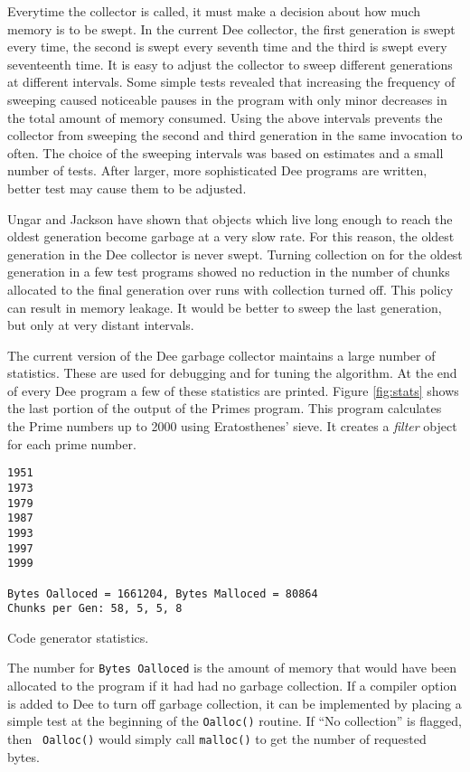 Everytime the collector is called, it must make a decision about how
much memory is to be swept.  In the current Dee collector, the first
generation is swept every time, the second is swept every seventh time
and the third is swept every seventeenth time.  It is easy to adjust
the collector to sweep different generations at different intervals.
Some simple tests revealed that increasing the frequency of sweeping
caused noticeable pauses in the program with only minor decreases in
the total amount of memory consumed.  Using the above intervals
prevents the collector from sweeping the second and third generation
in the same invocation to often.  The choice of the sweeping intervals
was based on estimates and a small number of tests.  After larger,
more sophisticated Dee programs are written, better test may cause
them to be adjusted.

Ungar and Jackson \cite{Ungar88} have shown that objects which live
long enough to reach the oldest generation become garbage at a very
slow rate.  For this reason, the oldest generation in the Dee
collector is never swept.  Turning collection on for the oldest
generation in a few test programs showed no reduction in the number of
chunks allocated to the final generation over runs with collection
turned off.  This policy can result in memory leakage.  It would be
better to sweep the last generation, but only at very distant
intervals.

The current version of the Dee garbage collector maintains a large
number of statistics.  These are used for debugging and for tuning the
algorithm.  At the end of every Dee program a few of these statistics
are printed.  Figure \ref{fig:stats} shows the last portion of the
output of the Primes program.  This program calculates the Prime
numbers up to 2000 using Eratosthenes' sieve.  It creates a {\em
filter} object for each prime number.

\begin{shortfigure}
\begin{verbatim}
1951 
1973 
1979 
1987 
1993 
1997 
1999 

Bytes Oalloced = 1661204, Bytes Malloced = 80864
Chunks per Gen: 58, 5, 5, 8
\end{verbatim}
\caption{Code generator statistics.}
\label{fig:stats}
\end{shortfigure}

The number for {\tt Bytes Oalloced} is the amount of memory that would
have been allocated to the program if it had had no garbage collection.
If a compiler option is added to Dee to turn off garbage collection,
it can be implemented by placing a simple test at the beginning of the
{\tt Oalloc()} routine.  If ``No collection'' is flagged, then {\tt
Oalloc()} would simply call {\tt malloc()} to get the number of
requested bytes.

